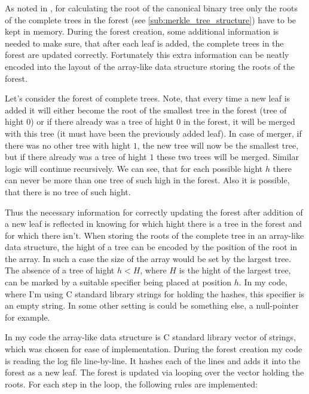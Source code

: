 \documentclass[11pt]{article}
\newcommand{\CC}{C\nolinebreak\hspace{-.05em}\raisebox{.4ex}{\tiny\bf +}\nolinebreak\hspace{-.10em}\raisebox{.4ex}{\tiny\bf +}}
\def\CC{{C\nolinebreak[4]\hspace{-.05em}\raisebox{.4ex}{\tiny\bf ++}} }
\begin{document}
As noted in \cite{Buldas2014}, for calculating the root of the canonical binary tree only the roots of the complete trees in the forest (see \cref{sub:merkle_tree_structure}) have to be kept in memory. During the forest creation, some additional information is needed to make sure, that after each leaf is added, the complete trees in the forest are updated correctly. Fortunately this extra information can be neatly encoded into the layout of the array-like data structure storing the roots of the forest. 

Let's consider the forest of complete trees. Note, that every time a new leaf is added it will either become the root of the smallest tree in the forest (tree of hight $0$) or if there already was a tree of hight $0$ in the forest, it will be merged with this tree (it must have been the previously added leaf). In case of merger, if there was no other tree with hight $1$, the new tree will now be the smallest tree, but if there already was a tree of hight $1$ these two trees will be merged. Similar logic will continue recursively. We can see, that for each possible hight $h$ there can never be more than one tree of such high in the forest. Also it is possible, that there is no tree of such hight.

Thus the necessary information for correctly updating the forest after addition of a new leaf is reflected in knowing for which hight there is a tree in the forest and for which there isn't. When storing the roots of the complete tree in an array-like data structure, the hight of a tree can be encoded by the position of the root in the array. In such a case the size of the array would be set by the largest tree. The absence of a tree of hight $h<H$, where $H$ is the hight of the largest tree, can be marked by a suitable specifier being placed at position $h$. In my code, where I'm using \CC standard library strings for holding the hashes, this specifier is an empty string. In some other setting is could be something else, a null-pointer for example.

In my code the array-like data structure is \CC standard library vector of strings, which was chosen for ease of implementation. During the forest creation my code is reading the log file line-by-line. It hashes each of the lines and adds it into the forest as a new leaf. The forest is updated via looping over the vector holding the roots. For each step in the loop, the following rules are implemented:
\end{document}
